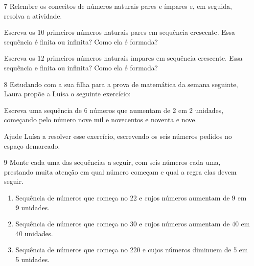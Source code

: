 \num{7} Relembre os conceitos de números naturais pares e ímpares e, em
seguida, resolva a atividade.

\begin{escolha}
\item
  Escreva os 10 primeiros números naturais pares em sequência crescente.
  Essa sequência é finita ou infinita? Como ela é formada?



\item
  Escreva os 12 primeiros números naturais ímpares em sequência
  crescente. Essa sequência e finita ou infinita? Como ela é formada?


\end{escolha}

\num{8} Estudando com a sua filha para a prova de matemática da semana
seguinte, Laura propõe a Luísa o seguinte exercício:

Escreva uma sequência de 6 números que aumentam de 2 em 2 unidades,
começando pelo número nove mil e novecentos e noventa e nove.

Ajude Luísa a resolver esse exercício, escrevendo os seis números pedidos no espaço demarcado.



\num{9} Monte cada uma das sequências a seguir, com seis números cada uma,
prestando muita atenção em qual número começam e qual a regra elas devem
seguir.

\begin{enumerate}
\item
  Sequência de números que começa no 22 e cujos números aumentam de 9 em 9 unidades.


\item
  Sequência de números que começa no 30 e cujos números aumentam de 40 em 40 unidades.


\item
  Sequência de números que começa no 220 e cujos números diminuem de 5 em 5 unidades.

\end{enumerate}


